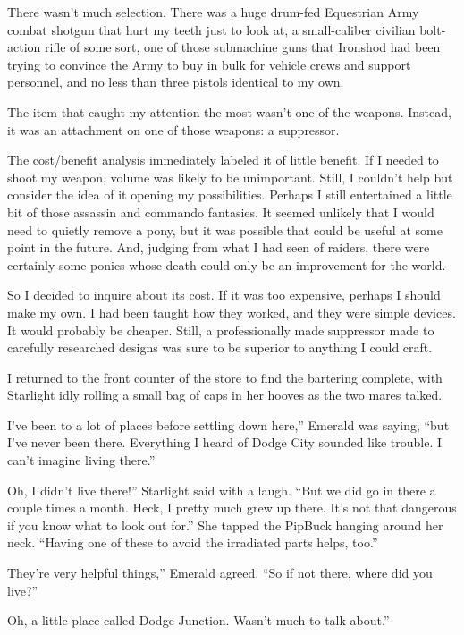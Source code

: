There wasn’t much selection. There was a huge drum-fed Equestrian Army combat shotgun that hurt my teeth just to look at, a small-caliber civilian bolt-action rifle of some sort, one of those submachine guns that Ironshod had been trying to convince the Army to buy in bulk for vehicle crews and support personnel, and no less than three pistols identical to my own.

The item that caught my attention the most wasn’t one of the weapons. Instead, it was an attachment on one of those weapons: a suppressor.

The cost/benefit analysis immediately labeled it of little benefit. If I needed to shoot my weapon, volume was likely to be unimportant. Still, I couldn’t help but consider the idea of it opening my possibilities. Perhaps I still entertained a little bit of those assassin and commando fantasies. It seemed unlikely that I would need to quietly remove a pony, but it was possible that could be useful at some point in the future. And, judging from what I had seen of raiders, there were certainly some ponies whose death could only be an improvement for the world.

So I decided to inquire about its cost. If it was too expensive, perhaps I should make my own. I had been taught how they worked, and they were simple devices. It would probably be cheaper. Still, a professionally made suppressor made to carefully researched designs was sure to be superior to anything I could craft.

I returned to the front counter of the store to find the bartering complete, with Starlight idly rolling a small bag of caps in her hooves as the two mares talked.

\leavevmode{}I’ve been to a lot of places before settling down here,” Emerald was saying, “but I’ve never been there. Everything I heard of Dodge City sounded like trouble. I can’t imagine living there.”

\leavevmode{}Oh, I didn’t live there!” Starlight said with a laugh. “But we did go in there a couple times a month. Heck, I pretty much grew up there. It’s not that dangerous if you know what to look out for.” She tapped the PipBuck hanging around her neck. “Having one of these to avoid the irradiated parts helps, too.”

\leavevmode{}They’re very helpful things,” Emerald agreed. “So if not there, where did you live?”

\leavevmode{}Oh, a little place called Dodge Junction. Wasn’t much to talk about.”

